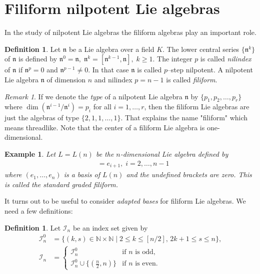 \documentclass[12pt]{amsart}
\newtheorem{example}[thm]{Example}
\theoremstyle{definition}
\newtheorem{defi}[thm]{Definition}
\theoremstyle{remark}
\newtheorem{rem}[thm]{Remark}
\newcommand{\N}{\mathbb{N}}
\newcommand{\Ln}{\mathfrak{n}}
\newcommand{\CI}{\mathcal{I}}
\begin{document}
\section{Filiform nilpotent Lie algebras}

In the study of nilpotent Lie algebras the filiform algebras
play an important role.

\begin{defi}
Let $\Ln$ be a Lie algebra over a field $K$. The lower central series
$\{\Ln^k\}$ of $\Ln$ is defined by
$\Ln^0=\Ln ,\; \Ln^k =[\Ln^{k-1},\Ln], \; k\ge 1.$
The integer $p$ is called {\it nilindex} of $\Ln$ if $\Ln^{p}=0$ and
$\Ln^{p-1}\ne 0$. In that case $\Ln$ is called $p$--step nilpotent.
A nilpotent Lie algebra $\Ln$ of dimension $n$ and nilindex $p=n-1$ is
called {\it filiform}.
\end{defi}

\begin{rem}
If we denote the {\it type} of a nilpotent Lie algebra
$\Ln$ by $\{p_1,p_2,\ldots ,p_r\}$ where $\dim (\Ln^{i-1}/\Ln^i)=
p_i$ for all $i=1,\ldots ,r$, then the filiform Lie algebras
are just the algebras of type $\{2,1,1,\ldots,1\}$. That explains the
name "filiform" which means threadlike. Note that the center of a
filiform Lie algebra is one-dimensional.
\end{rem}

\begin{example}\label{std}
Let $L=L(n)$ be the $n$-dimensional Lie algebra defined by
\begin{align*}
[e_1,e_i] & = e_{i+1}, \; i=2,\dots , n-1
\end{align*}
where $(e_1,\dots , e_n)$ is a basis of $L(n)$ and the undefined
brackets are zero. This is called the {\it standard graded filiform}.
\end{example}

It turns out to be useful to consider {\it adapted bases} for filiform
Lie algebras. We need a few definitions:

\begin{defi}
Let $\CI_n$ be an index set given by
\begin{align*}
\CI_n^0 &=\{(k,s)\in \N \times \N \mid 2 \le k \le [n/2],\,
2k+1 \le s \le n \},\\
\CI_n& =\begin{cases}
\CI_n^0 & \text{if $n$ is odd},\\
\CI_n^0 \cup \{(\frac{n}{2},n)\} & \text{if $n$ is even}.
\end{cases}
\end{align*}
\end{defi}
\end{document}
